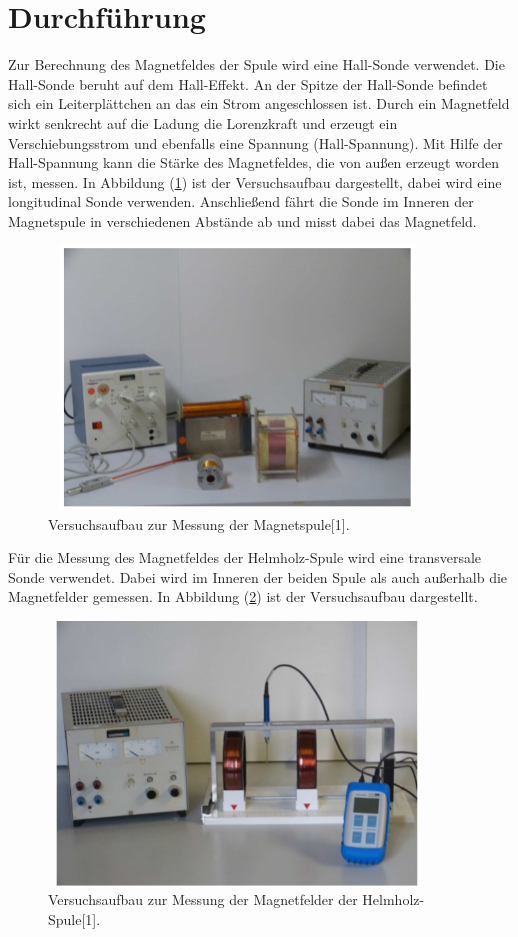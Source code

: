 \section{Durchführung}
Zur Berechnung des Magnetfeldes der Spule wird eine Hall-Sonde verwendet.
Die Hall-Sonde beruht auf dem Hall-Effekt. An der Spitze der Hall-Sonde befindet sich
ein Leiterplättchen an das ein Strom angeschlossen ist. Durch ein Magnetfeld wirkt senkrecht
auf die Ladung die Lorenzkraft und erzeugt ein Verschiebungsstrom und ebenfalls eine Spannung (Hall-Spannung).
Mit Hilfe der Hall-Spannung kann die Stärke des Magnetfeldes, die von außen erzeugt worden ist, messen.
In Abbildung (\ref{abb:4}) ist der Versuchsaufbau dargestellt, dabei wird eine longitudinal Sonde verwenden.
Anschließend fährt die Sonde im Inneren der Magnetspule in verschiedenen Abstände ab und misst dabei das
Magnetfeld.
\begin{figure}[H]
  \centering
  \includegraphics[width=10cm, height= 7cm]{Abb4.png}
  \caption{Versuchsaufbau zur Messung der Magnetspule[1].}
  \label{abb:4}
\end{figure}
Für die Messung des Magnetfeldes der Helmholz-Spule wird eine transversale Sonde verwendet.
Dabei wird im Inneren der beiden Spule als auch außerhalb die Magnetfelder gemessen.
In Abbildung (\ref{abb:5}) ist der Versuchsaufbau dargestellt.
\begin{figure}[H]
  \centering
  \includegraphics[width=10cm, height= 7cm]{Abb5.png}
  \caption{Versuchsaufbau zur Messung der Magnetfelder der Helmholz-Spule[1].}
  \label{abb:5}
\end{figure}
